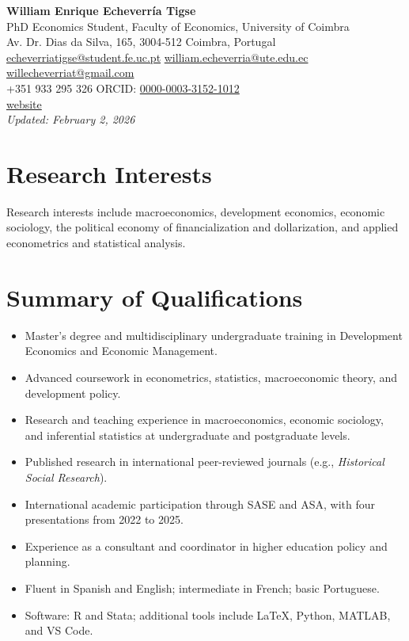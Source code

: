 ﻿\documentclass[11pt]{article}
\begin{document}
\begin{center}
{\LARGE \textbf{William Enrique Echeverr\'ia Tigse}}\\
\vspace{4pt}
PhD Economics Student, Faculty of Economics, University of Coimbra\\
Av. Dr. Dias da Silva, 165, 3004-512 Coimbra, Portugal\\
\href{mailto:echeverriatigse@student.fe.uc.pt}{echeverriatigse@student.fe.uc.pt} \textbullet{}
\href{mailto:william.echeverria@ute.edu.ec}{william.echeverria@ute.edu.ec} \textbullet{}
\href{mailto:willecheverriat@gmail.com}{willecheverriat@gmail.com}\\
+351 933 295 326 \textbullet{} ORCID: \href{https://orcid.org/0000-0003-3152-1012}{0000-0003-3152-1012}\\
\href{https://willecheverria8.github.io/My_website/}{website}\\
\vspace{2pt}
\textit{Updated: February 2, 2026}
\end{center}

\section*{Research Interests}
Research interests include macroeconomics, development economics, economic sociology, the political economy of financialization and dollarization, and applied econometrics and statistical analysis.

\section*{Summary of Qualifications}
\begin{itemize}
\item Master's degree and multidisciplinary undergraduate training in Development Economics and Economic Management.
\item Advanced coursework in econometrics, statistics, macroeconomic theory, and development policy.
\item Research and teaching experience in macroeconomics, economic sociology, and inferential statistics at undergraduate and postgraduate levels.
\item Published research in international peer-reviewed journals (e.g., \textit{Historical Social Research}).
\item International academic participation through SASE and ASA, with four presentations from 2022 to 2025.
\item Experience as a consultant and coordinator in higher education policy and planning.
\item Fluent in Spanish and English; intermediate in French; basic Portuguese.
\item Software: R and Stata; additional tools include LaTeX, Python, MATLAB, and VS Code.
\end{itemize}
\end{document}
